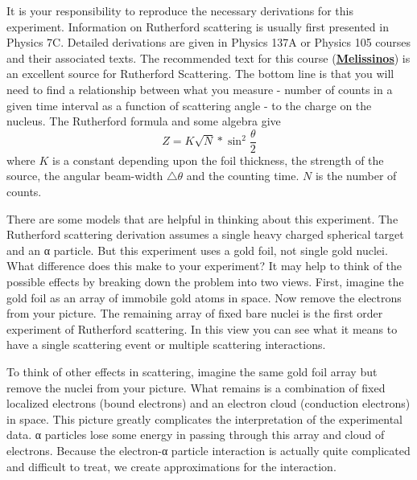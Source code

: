 \documentclass{../lab}
\begin{document}
It is your responsibility to reproduce the necessary derivations for this experiment. Information on Rutherford scattering is usually first presented in Physics 7C. Detailed derivations are given in Physics 137A or Physics 105 courses and their associated texts. The recommended text for this course (\href{http://physics111.lib.berkeley.edu/Physics111/Reprints/RUT/RUT\%20\%20melissinos\%201966\%20rutherford\%20scattering.pdf}{\textbf{Melissinos}}) is an excellent source for Rutherford Scattering. The bottom line is that you will need to find a relationship between what you measure - number of counts in a given time interval as a function of scattering angle - to the charge on the nucleus. The Rutherford formula and some algebra give
\[Z = K \sqrt{N} * \sin^2 \frac{\theta}{2}\]
where $K$ is a constant depending upon the foil thickness, the strength of the source, the angular beam-width $\triangle \theta$ and the counting time. $N$ is the number of counts.

There are some models that are helpful in thinking about this experiment. The Rutherford scattering derivation assumes a single heavy charged spherical target and an α particle. But this experiment uses a gold foil, not single gold nuclei. What difference does this make to your experiment? It may help to think of the possible effects by breaking down the problem into two views. First, imagine the gold foil as an array of immobile gold atoms in space. Now remove the electrons from your picture. The remaining array of fixed bare nuclei is the first order experiment of Rutherford scattering. In this view you can see what it means to have a single scattering event or multiple scattering interactions.

To think of other effects in scattering, imagine the same gold foil array but remove the nuclei from your picture. What remains is a combination of fixed localized electrons (bound electrons) and an electron cloud (conduction electrons) in space. This picture greatly complicates the interpretation of the experimental data. α particles lose some energy in passing through this array and cloud of electrons. Because the electron-α particle interaction is actually quite complicated and difficult to treat, we create approximations for the interaction.
\end{document}
